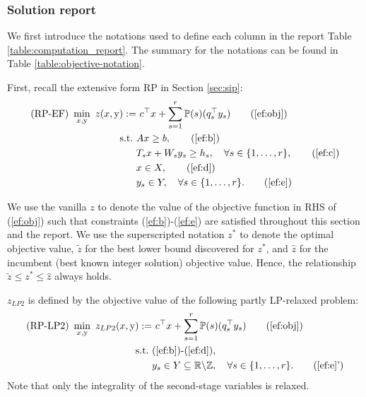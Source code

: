 \subsubsection{Solution report}
We first introduce the notations used to define each column in the report Table \ref{table:computation_report}. The summary for the notations can be found in Table \ref{table:objective-notation}.

First, recall the extensive form RP in Section \ref{sec:sip}:
\begin{subequations}\label{ef}
	\begin{align}
	\textrm{(RP-EF) }\min_{x,\mathrm{y}}\ z(x,\mathrm{y}):=&\ c^{\top}x + \sum_{s=1}^{r}\PP(s) (q_s^{\top}y_s) \tag{\ref{ef:obj}}\\ 
	\mathrm{s.t.}\ &Ax\ge b,  \tag{\ref{ef:b}}\\
	&T_s x+W_s y_s\ge h_s,\quad\forall s\in\{1,\ldots,r\}, \tag{\ref{ef:c}} \\
	&x\in X, \tag{\ref{ef:d}} \\
	&y_s \in Y,\quad\forall s\in\{1,\ldots,r\}. \tag{\ref{ef:e}}
	\end{align}
\end{subequations}

We use the vanilla $z$ to denote the value of the objective function in RHS of (\ref{ef:obj}) such that constraints (\ref{ef:b})-(\ref{ef:e}) are satisfied throughout this section and the report. We use the superscripted notation $z^*$ to denote the optimal objective value, $\tilde{z}$ for the best lower bound discovered for $z^*$, and $\hat{z}$ for the incumbent (best known integer solution) objective value. Hence, the relationship $\tilde{z}\le z^*\le\hat{z}$ always holds.

$z_{LP2}$ is defined by the objective value of the following partly LP-relaxed problem:
\begin{subequations}\label{ef-lp2}
	\begin{align}
	\textrm{(RP-LP2) }\min_{x,\mathrm{y}}\ z_{LP2}(x,\mathrm{y}):=&\ c^{\top}x + \sum_{s=1}^{r}\PP(s) (q_s^{\top}y_s) \tag{\ref{ef:obj}}\\ 
	\mathrm{s.t.}\ &\textrm{(\ref{ef:b})-(\ref{ef:d})}, \nonumber \\
	& y_s \in Y \subseteq \mathbb{R}\backslash\mathbb{Z} ,\quad\forall s\in\{1,\ldots,r\}. \tag{\ref{ef:e}'}
	\end{align}
\end{subequations}
Note that only the integrality of the second-stage variables is relaxed.

